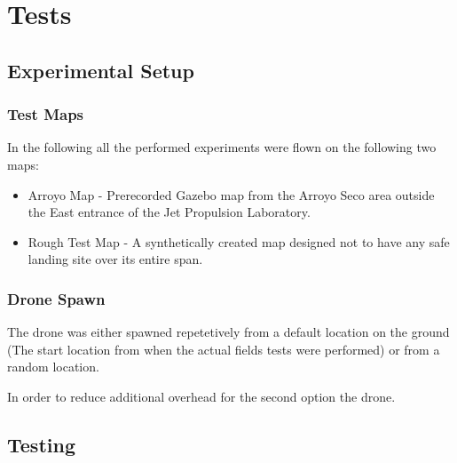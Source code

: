 \chapter{Tests}
\label{sec:tests}

\section{Experimental Setup}
\subsection{Test Maps}
In the following all the performed experiments were flown on the following two maps:
\begin{itemize}
    \item Arroyo Map - Prerecorded Gazebo map from the Arroyo Seco area outside the East entrance of the Jet Propulsion Laboratory.
    \item Rough Test Map - A synthetically created map designed not to have any safe landing site over its entire span. 
\end{itemize}
\subsection{Drone Spawn}
The drone was either spawned repetetively from a default location on the ground (The start location from when the actual fields tests were performed) or from a random location.

In order to reduce additional overhead for the second option the drone.

\section{Testing}


